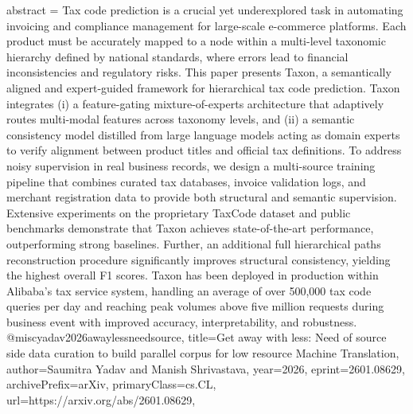 {      abstract = {Tax code prediction is a crucial yet underexplored task in automating invoicing and compliance management for large-scale e-commerce platforms. Each product must be accurately mapped to a node within a multi-level taxonomic hierarchy defined by national standards, where errors lead to financial inconsistencies and regulatory risks. This paper presents Taxon, a semantically aligned and expert-guided framework for hierarchical tax code prediction. Taxon integrates (i) a feature-gating mixture-of-experts architecture that adaptively routes multi-modal features across taxonomy levels, and (ii) a semantic consistency model distilled from large language models acting as domain experts to verify alignment between product titles and official tax definitions. To address noisy supervision in real business records, we design a multi-source training pipeline that combines curated tax databases, invoice validation logs, and merchant registration data to provide both structural and semantic supervision. Extensive experiments on the proprietary TaxCode dataset and public benchmarks demonstrate that Taxon achieves state-of-the-art performance, outperforming strong baselines. Further, an additional full hierarchical paths reconstruction procedure significantly improves structural consistency, yielding the highest overall F1 scores. Taxon has been deployed in production within Alibaba's tax service system, handling an average of over 500,000 tax code queries per day and reaching peak volumes above five million requests during business event with improved accuracy, interpretability, and robustness.}
}@misc{yadav2026awaylessneedsource,
      title={Get away with less: Need of source side data curation to build parallel corpus for low resource Machine Translation}, 
      author={Saumitra Yadav and Manish Shrivastava},
      year={2026},
      eprint={2601.08629},
      archivePrefix={arXiv},
      primaryClass={cs.CL},
      url={https://arxiv.org/abs/2601.08629},
}
